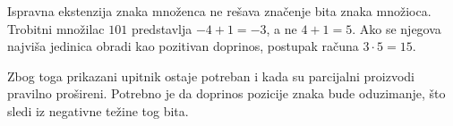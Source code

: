 Ispravna ekstenzija znaka množenca ne rešava značenje bita znaka množioca. Trobitni množilac $101$ predstavlja $-4+1=-3$, a ne $4+1=5$. Ako se njegova najviša jedinica obradi kao pozitivan doprinos, postupak računa $3\cdot5=15$.

Zbog toga prikazani upitnik ostaje potreban i kada su parcijalni proizvodi pravilno prošireni. Potrebno je da doprinos pozicije znaka bude oduzimanje, što sledi iz negativne težine tog bita.
